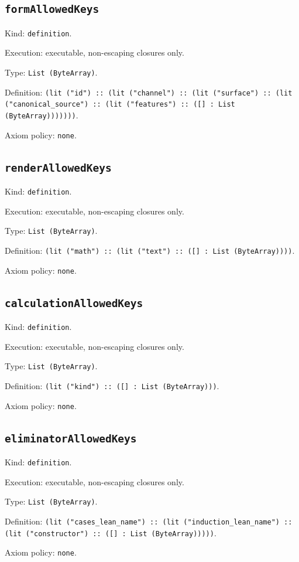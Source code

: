 \documentclass[11pt]{article}
\begin{document}
\subsection*{\texttt{formAllowedKeys}}
\noindent Kind: \texttt{definition}.\par
\noindent Execution: executable, non-escaping closures only.\par
\noindent Type: \texttt{List (ByteArray)}.\par
\noindent Definition: \texttt{(lit ("id") :: (lit ("channel") :: (lit ("surface") :: (lit ("canonical\_source") :: (lit ("features") :: ([] : List (ByteArray)))))))}.\par
\noindent Axiom policy: \texttt{none}.\par
\subsection*{\texttt{renderAllowedKeys}}
\noindent Kind: \texttt{definition}.\par
\noindent Execution: executable, non-escaping closures only.\par
\noindent Type: \texttt{List (ByteArray)}.\par
\noindent Definition: \texttt{(lit ("math") :: (lit ("text") :: ([] : List (ByteArray))))}.\par
\noindent Axiom policy: \texttt{none}.\par
\subsection*{\texttt{calculationAllowedKeys}}
\noindent Kind: \texttt{definition}.\par
\noindent Execution: executable, non-escaping closures only.\par
\noindent Type: \texttt{List (ByteArray)}.\par
\noindent Definition: \texttt{(lit ("kind") :: ([] : List (ByteArray)))}.\par
\noindent Axiom policy: \texttt{none}.\par
\subsection*{\texttt{eliminatorAllowedKeys}}
\noindent Kind: \texttt{definition}.\par
\noindent Execution: executable, non-escaping closures only.\par
\noindent Type: \texttt{List (ByteArray)}.\par
\noindent Definition: \texttt{(lit ("cases\_lean\_name") :: (lit ("induction\_lean\_name") :: (lit ("constructor") :: ([] : List (ByteArray)))))}.\par
\noindent Axiom policy: \texttt{none}.\par
\end{document}
